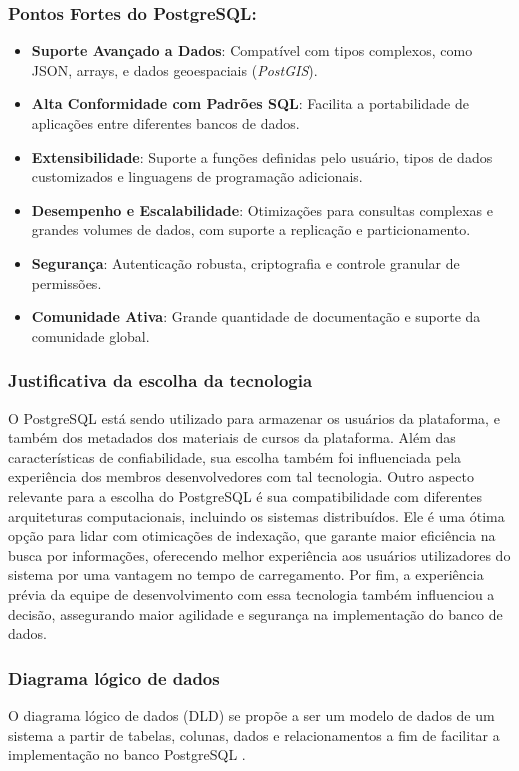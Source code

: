 \subsubsection*{Pontos Fortes do PostgreSQL:}
\begin{itemize}
    \item \textbf{Suporte Avançado a Dados}: Compatível com tipos complexos, como JSON, arrays, e dados geoespaciais (\textit{PostGIS}).
    \item \textbf{Alta Conformidade com Padrões SQL}: Facilita a portabilidade de aplicações entre diferentes bancos de dados.
    \item \textbf{Extensibilidade}: Suporte a funções definidas pelo usuário, tipos de dados customizados e linguagens de programação adicionais.
    \item \textbf{Desempenho e Escalabilidade}: Otimizações para consultas complexas e grandes volumes de dados, com suporte a replicação e particionamento.
    \item \textbf{Segurança}: Autenticação robusta, criptografia e controle granular de permissões.
    \item \textbf{Comunidade Ativa}: Grande quantidade de documentação e suporte da comunidade global.
\end{itemize}

\subsubsection{Justificativa da escolha da tecnologia}
O PostgreSQL está sendo utilizado para armazenar os usuários da plataforma, e também dos metadados dos materiais de cursos da plataforma. Além das características de confiabilidade, sua escolha também foi influenciada pela experiência dos membros desenvolvedores com tal tecnologia. Outro aspecto relevante para a escolha do PostgreSQL é sua compatibilidade com diferentes arquiteturas computacionais, incluindo os sistemas distribuídos. Ele é uma ótima opção para lidar com otimicações de indexação, que garante maior eficiência na busca por informações, oferecendo melhor experiência aos usuários utilizadores do sistema por uma vantagem no tempo de carregamento. Por fim, a experiência prévia da equipe de desenvolvimento com essa tecnologia também influenciou a decisão, assegurando maior agilidade e segurança na implementação do banco de dados.

\subsubsection{Diagrama lógico de dados}
O diagrama lógico de dados (DLD) se propõe a ser um modelo de dados de um sistema a partir de tabelas, colunas, dados e relacionamentos a fim de facilitar a implementação no banco PostgreSQL \cite{lucidchart2025}.

